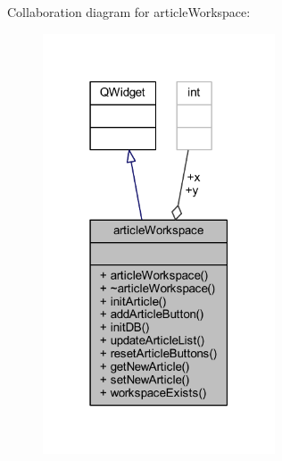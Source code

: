 Collaboration diagram for article\+Workspace\+:
\nopagebreak
\begin{figure}[H]
\begin{center}
\leavevmode
\includegraphics[width=195pt]{classarticle_workspace__coll__graph}
\end{center}
\end{figure}

